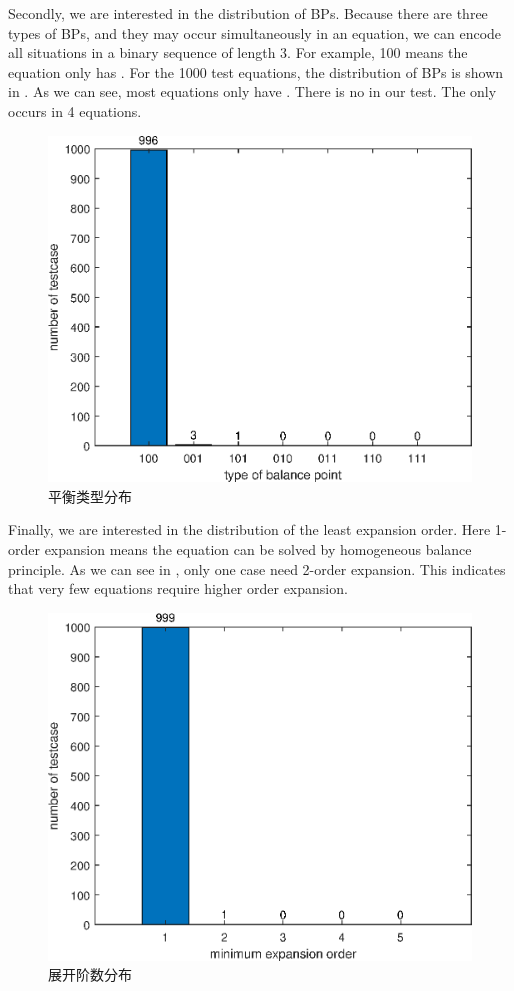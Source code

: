 Secondly, we are interested in the distribution of BPs. Because there are three types of BPs, and they may occur simultaneously in an equation, we can encode all situations in a binary sequence of length 3. For example, 100 means the equation only has \BPone{}. For the 1000 test equations, the distribution of BPs is shown in . As we can see, most equations only have \BPone{}. There is no \BPtwo{} in our test. The \BPthree{} only occurs in 4 equations.
\begin{figure}[H]
\centering
\includegraphics[width=\figwidth]{fig/nbps.eps}
\caption{平衡类型分布}
\label{d-bps}
\end{figure}

Finally, we are interested in the distribution of the least expansion order. Here 1-order expansion means the equation can be solved by homogeneous balance principle. As we can see in , only one case need 2-order expansion. This indicates that very few equations require higher order expansion.
\begin{figure}[H]
\centering
\includegraphics[width=\figwidth]{fig/nexp.eps}
\caption{展开阶数分布}
\label{d-nexp}
\end{figure}

